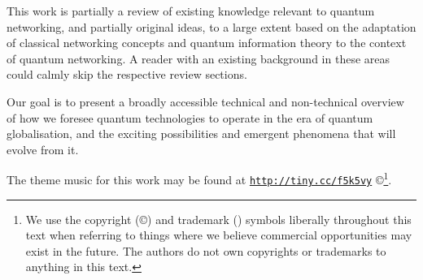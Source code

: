 This work is partially a review of existing knowledge relevant to quantum networking, and partially original ideas, to a large extent based on the adaptation of classical networking concepts and quantum information theory to the context of quantum networking. A reader with an existing background in these areas could calmly skip the respective review sections.

Our goal is to present a broadly accessible technical and non-technical overview of how we foresee quantum technologies to operate in the era of quantum globalisation, and the exciting possibilities and emergent phenomena that will evolve from it.

The theme music for this work may be found at \texttt{\href{http://soundcloud.com/peter-rohde/wir-sind-ein-volk}{http://tiny.cc/f5k5vy}} \copyright{}\footnote{We use the copyright (\copyright) and trademark (\texttrademark) symbols liberally throughout this text when referring to things where we believe commercial opportunities may exist in the future. The authors do not own copyrights or trademarks to anything in this text.}.